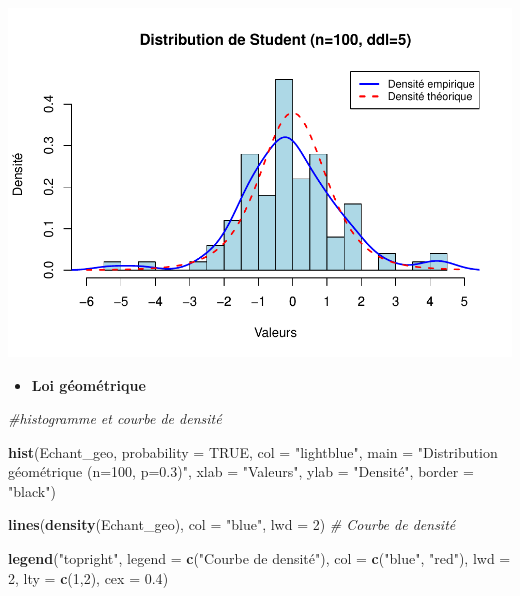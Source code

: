 \documentclass[
  12pt,
]{article}
\newenvironment{Shaded}{\begin{snugshade}}{\end{snugshade}}
\newcommand{\AttributeTok}[1]{\textcolor[rgb]{0.13,0.29,0.53}{#1}}
\newcommand{\CommentTok}[1]{\textcolor[rgb]{0.56,0.35,0.01}{\textit{#1}}}
\newcommand{\ConstantTok}[1]{\textcolor[rgb]{0.56,0.35,0.01}{#1}}
\newcommand{\DecValTok}[1]{\textcolor[rgb]{0.00,0.00,0.81}{#1}}
\newcommand{\FloatTok}[1]{\textcolor[rgb]{0.00,0.00,0.81}{#1}}
\newcommand{\FunctionTok}[1]{\textcolor[rgb]{0.13,0.29,0.53}{\textbf{#1}}}
\newcommand{\NormalTok}[1]{#1}
\newcommand{\StringTok}[1]{\textcolor[rgb]{0.31,0.60,0.02}{#1}}
\providecommand{\tightlist}{%
  \setlength{\itemsep}{0pt}\setlength{\parskip}{0pt}}
\begin{document}
\includegraphics{Stat_non_para_files/figure-latex/unnamed-chunk-6-1.pdf}

\begin{itemize}
\tightlist
\item
  \textbf{Loi géométrique}
\end{itemize}

\begin{Shaded}
\begin{Highlighting}[]
\CommentTok{\#histogramme et courbe de densité}

\FunctionTok{hist}\NormalTok{(Echant\_geo, }\AttributeTok{probability =} \ConstantTok{TRUE}\NormalTok{, }\AttributeTok{col =} \StringTok{"lightblue"}\NormalTok{, }
     \AttributeTok{main =} \StringTok{"Distribution géométrique (n=100, p=0.3)"}\NormalTok{,}
     \AttributeTok{xlab =} \StringTok{"Valeurs"}\NormalTok{, }\AttributeTok{ylab =} \StringTok{"Densité"}\NormalTok{, }\AttributeTok{border =} \StringTok{"black"}\NormalTok{)}

\FunctionTok{lines}\NormalTok{(}\FunctionTok{density}\NormalTok{(Echant\_geo), }\AttributeTok{col =} \StringTok{"blue"}\NormalTok{, }\AttributeTok{lwd =} \DecValTok{2}\NormalTok{) }\CommentTok{\# Courbe de densité}


\FunctionTok{legend}\NormalTok{(}\StringTok{"topright"}\NormalTok{, }\AttributeTok{legend =} \FunctionTok{c}\NormalTok{(}\StringTok{"Courbe de densité"}\NormalTok{), }
       \AttributeTok{col =} \FunctionTok{c}\NormalTok{(}\StringTok{"blue"}\NormalTok{, }\StringTok{"red"}\NormalTok{), }\AttributeTok{lwd =} \DecValTok{2}\NormalTok{, }\AttributeTok{lty =} \FunctionTok{c}\NormalTok{(}\DecValTok{1}\NormalTok{,}\DecValTok{2}\NormalTok{), }\AttributeTok{cex =} \FloatTok{0.4}\NormalTok{)}
\end{Highlighting}
\end{Shaded}
\end{document}

